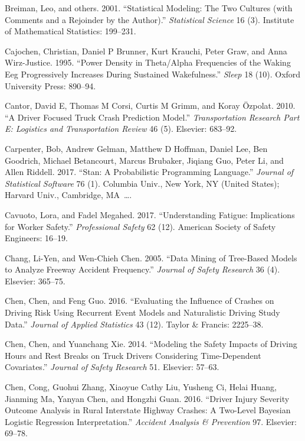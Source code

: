 \documentclass[12pt]{book}
\numberwithin{equation}{chapter}
\begin{document}
\leavevmode\hypertarget{ref-breiman2001statistical}{}%
Breiman, Leo, and others. 2001. ``Statistical Modeling: The Two Cultures (with Comments and a Rejoinder by the Author).'' \emph{Statistical Science} 16 (3). Institute of Mathematical Statistics: 199--231.

\leavevmode\hypertarget{ref-cajochen1995power}{}%
Cajochen, Christian, Daniel P Brunner, Kurt Krauchi, Peter Graw, and Anna Wirz-Justice. 1995. ``Power Density in Theta/Alpha Frequencies of the Waking Eeg Progressively Increases During Sustained Wakefulness.'' \emph{Sleep} 18 (10). Oxford University Press: 890--94.

\leavevmode\hypertarget{ref-cantor2010driver}{}%
Cantor, David E, Thomas M Corsi, Curtis M Grimm, and Koray Özpolat. 2010. ``A Driver Focused Truck Crash Prediction Model.'' \emph{Transportation Research Part E: Logistics and Transportation Review} 46 (5). Elsevier: 683--92.

\leavevmode\hypertarget{ref-carpenter2017stan}{}%
Carpenter, Bob, Andrew Gelman, Matthew D Hoffman, Daniel Lee, Ben Goodrich, Michael Betancourt, Marcus Brubaker, Jiqiang Guo, Peter Li, and Allen Riddell. 2017. ``Stan: A Probabilistic Programming Language.'' \emph{Journal of Statistical Software} 76 (1). Columbia Univ., New York, NY (United States); Harvard Univ., Cambridge, MA~\ldots{}.

\leavevmode\hypertarget{ref-cavuoto2017understanding}{}%
Cavuoto, Lora, and Fadel Megahed. 2017. ``Understanding Fatigue: Implications for Worker Safety.'' \emph{Professional Safety} 62 (12). American Society of Safety Engineers: 16--19.

\leavevmode\hypertarget{ref-chang2005data}{}%
Chang, Li-Yen, and Wen-Chieh Chen. 2005. ``Data Mining of Tree-Based Models to Analyze Freeway Accident Frequency.'' \emph{Journal of Safety Research} 36 (4). Elsevier: 365--75.

\leavevmode\hypertarget{ref-chen2016evaluating}{}%
Chen, Chen, and Feng Guo. 2016. ``Evaluating the Influence of Crashes on Driving Risk Using Recurrent Event Models and Naturalistic Driving Study Data.'' \emph{Journal of Applied Statistics} 43 (12). Taylor \& Francis: 2225--38.

\leavevmode\hypertarget{ref-chen2014modeling}{}%
Chen, Chen, and Yuanchang Xie. 2014. ``Modeling the Safety Impacts of Driving Hours and Rest Breaks on Truck Drivers Considering Time-Dependent Covariates.'' \emph{Journal of Safety Research} 51. Elsevier: 57--63.

\leavevmode\hypertarget{ref-chen2016driver}{}%
Chen, Cong, Guohui Zhang, Xiaoyue Cathy Liu, Yusheng Ci, Helai Huang, Jianming Ma, Yanyan Chen, and Hongzhi Guan. 2016. ``Driver Injury Severity Outcome Analysis in Rural Interstate Highway Crashes: A Two-Level Bayesian Logistic Regression Interpretation.'' \emph{Accident Analysis \& Prevention} 97. Elsevier: 69--78.
\end{document}
